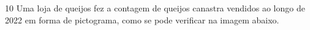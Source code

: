 {{{\begin{escolha}
{{{{\begin{escolha}
\begin{escolha}
{%


\num{10} Uma loja de queijos fez a contagem de queijos canastra vendidos ao
longo de 2022 em forma de pictograma, como se pode verificar na imagem abaixo. 

}
\end{escolha}
\end{escolha}}}}}
\end{escolha}}}}

